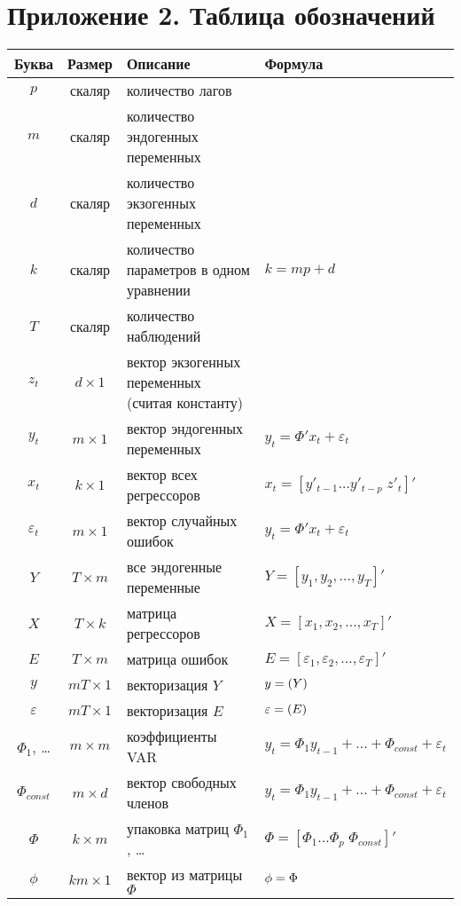 \documentclass[11pt]{article} %
\let\vec\relax
\DeclareMathOperator{\vec}{vec}
\begin{document}
\section*{Приложение 2. Таблица обозначений}

\begin{center}
\begin{tabular}{ccp{6cm}l}
\toprule
Буква & Размер &  Описание & Формула \\
\midrule
$p$ & скаляр & количество лагов & \\
$m$ & скаляр & количество эндогенных переменных & \\
$d$ & скаляр & количество экзогенных переменных & \\
$k$ & скаляр & количество параметров в одном уравнении & $k=mp+d$ \\
$T$ & скаляр & количество наблюдений &  \\
\midrule
$z_t$ & $d \times 1$ & вектор экзогенных переменных (считая константу) & \\
$y_t$ & $m \times 1$ & вектор эндогенных переменных  & $y_t=\Phi' x_t+\varepsilon_t$ \\
$x_t$ & $k \times 1$ & вектор всех регрессоров & $x_t=[ y'_{t-1} \ldots  y'_{t-p} \; z'_t ]'$ \\
$\varepsilon_t$ & $m \times 1$ & вектор случайных ошибок  & $y_t=\Phi' x_t+\varepsilon_t$\\
$Y$ & $T \times m$ & все эндогенные переменные & $Y=[y_1, y_2,\ldots, y_T]'$ \\
$X$ & $T \times k$ & матрица регрессоров& $X=[x_1, x_2,\ldots, x_T]'$ \\
$E$ & $T \times m$ & матрица ошибок & $E=[\varepsilon_1, \varepsilon_2,\ldots, \varepsilon_T]'$ \\
$y$&$mT\times 1$& векторизация $Y$&$y=\vec(Y)$\\
$\varepsilon$&$mT\times 1$ &векторизация $E$&$\varepsilon=\vec(E)$\\
\midrule
$\Phi_1$, \ldots & $m \times m$ & коэффициенты VAR & $y_t= \Phi_1 y_{t-1} + \ldots + \Phi_{const}+\varepsilon_t$ \\
$\Phi_{const}$ & $m \times d$ & вектор свободных членов& $y_t= \Phi_1 y_{t-1} + \ldots + \Phi_{const}+\varepsilon_t$ \\
$\Phi$ & $k \times m$ & упаковка матриц $\Phi_1$, \ldots & $\Phi=[ \Phi_1 \ldots \Phi_p \; \Phi_{const}]'$ \\
$\phi$ & $km \times 1$ & вектор из матрицы $\Phi$ & $\phi = \vec{\Phi}$ \\

\end{tabular}
\end{center}
\end{document}
